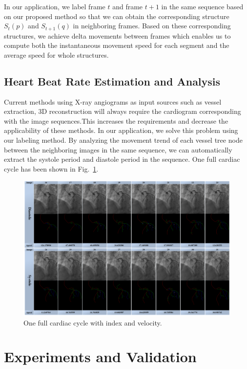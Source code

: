 \documentclass[journal]{IEEEtran}
\begin{document}
In our application, we label frame $t$ and frame $t+1$ in the same sequence based on our proposed method so that we can obtain the corresponding structure $S_{t}(p)$ and $S_{t+1}(q)$ in neighboring frames. Based on these corresponding structures, we achieve delta movements between frames which enables us to compute both the instantaneous movement speed for each segment and the average speed for whole structures. 

\subsection{Heart Beat Rate Estimation and Analysis}
Current methods using X-ray angiograms as input sources such as vessel extraction, 3D reconstruction will always require the cardiogram corresponding with the image sequences.This increases the requirements and decrease the applicability of these methods. In our application, we solve this problem using our labeling method. By analyzing the movement trend of each vessel tree node between the neighboring images in the same sequence, we can automatically extract the systole period and diastole period in the sequence. One full cardiac cycle has been shown in Fig.~\ref{fig:app_cardiac_cycle}. 

\begin{figure}[!t]
\centering
\includegraphics[width=1.0\linewidth]{./images/cardiac_cycle.png}
\caption{One full cardiac cycle with index and velocity.}
\label{fig:app_cardiac_cycle}
\end{figure}

\section{Experiments and Validation}
\end{document}
